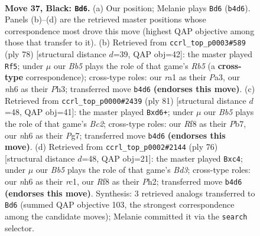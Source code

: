 \documentclass[11pt]{article}
\begin{document}
\clearpage

\begin{figure}[p]\centering
\begin{subfigure}{0.46\textwidth}\centering
\resizebox{\linewidth}{!}{%
\newchessgame
\chessboard[
  setfen={5r2/p6k/P5pN/1P4P1/1b3P2/2N5/3K4/R1B5 b - - 8 37},
  showmover=false,
  pgfstyle=straightmove, color=movearrow, markmove={b4-d6}
]}
\caption{}
\end{subfigure}\hfill
\begin{subfigure}{0.46\textwidth}\centering
\resizebox{\linewidth}{!}{%
\newchessgame
\chessboard[
  setfen={5B2/pk6/1n2r2p/1R4p1/5p2/P6P/5PP1/3K4 w - - 0 40},
  showmover=false,
  pgfstyle=straightmove, color=movearrow, markmove={b5-f5}
]}
\caption{}
\end{subfigure}
\\[4pt]
\begin{subfigure}{0.46\textwidth}\centering
\resizebox{\linewidth}{!}{%
\newchessgame
\chessboard[
  setfen={7k/1pb3p1/3N3p/1P1R4/7P/1r3P2/6PK/8 b - - 0 41},
  showmover=false,
  pgfstyle=straightmove, color=movearrow, markmove={c7-d6}
]}
\caption{}
\end{subfigure}\hfill
\begin{subfigure}{0.46\textwidth}\centering
\resizebox{\linewidth}{!}{%
\newchessgame
\chessboard[
  setfen={3R4/5p1k/4p1pp/1N6/2n3P1/3B4/6KP/2r5 w - - 1 39},
  showmover=false,
  pgfstyle=straightmove, color=movearrow, markmove={d3-c4}
]}
\caption{}
\end{subfigure}
\caption{\textbf{Move 37, Black: \texttt{Bd6}.} (a) Our position; Melanie plays \texttt{Bd6} (\texttt{b4d6}). Panels (b)--(d) are the retrieved master positions whose correspondence most drove this move (highest QAP objective among those that transfer to it). (b) Retrieved from \texttt{ccrl\_top\_p0003\#589} (ply 78) [structural distance $d$=39, QAP obj=42]: the master played \texttt{Rf5}; under $\mu$ our \emph{Bb5} plays the role of that game's \emph{Rb5} (a \textbf{cross-type} correspondence); cross-type roles: our \emph{r}a1 as their \emph{P}a3, our \emph{n}h6 as their \emph{P}h3; transferred move \texttt{b4d6} \textbf{(endorses this move)}. (c) Retrieved from \texttt{ccrl\_top\_p0000\#2439} (ply 81) [structural distance $d$=48, QAP obj=41]: the master played \texttt{Bxd6+}; under $\mu$ our \emph{Bb5} plays the role of that game's \emph{Bc2}; cross-type roles: our \emph{R}f8 as their \emph{P}b7, our \emph{n}h6 as their \emph{P}g7; transferred move \texttt{b4d6} \textbf{(endorses this move)}. (d) Retrieved from \texttt{ccrl\_top\_p0002\#2144} (ply 76) [structural distance $d$=48, QAP obj=21]: the master played \texttt{Bxc4}; under $\mu$ our \emph{Bb5} plays the role of that game's \emph{Bd3}; cross-type roles: our \emph{n}h6 as their \emph{r}c1, our \emph{R}f8 as their \emph{P}h2; transferred move \texttt{b4d6} \textbf{(endorses this move)}. Synthesis: 3 retrieved analogs transferred to \texttt{Bd6} (summed QAP objective 103, the strongest correspondence among the candidate moves); Melanie committed it via the \texttt{search} selector.}
\label{fig:thought-m73}
\end{figure}
\end{document}
